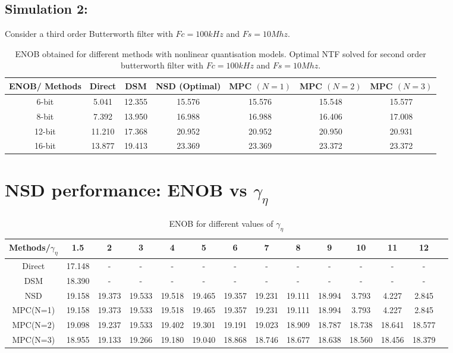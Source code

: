 \documentclass[a4paper]{article}
\begin{document}
\subsection{Simulation 2:}
Consider a third order Butterworth filter with $Fc = 100 \mathit{kHz}$ and $Fs = 10 \mathit{Mhz}$.
\begin{table}[!h]
	\caption{ENOB obtained for different methods with nonlinear quantisation models. Optimal NTF solved for second order butterworth filter with $Fc = 100 \mathit{kHz}$ and $Fs = 10 \mathit{Mhz}$.}
	\centering
	\begin{tabular}{|c|c|c|c|c|c|c|}
	\hline
	ENOB/ Methods & Direct & DSM & NSD (Optimal) & MPC $(N = 1)$ & MPC $(N= 2)$ & MPC $(N= 3)$  \\
        \hline
        6-bit &5.041 & 12.355 & 15.576 & 15.576 & 15.548 & 15.577\\
        \hline
        8-bit & 7.392 & 13.950 & 16.988  & 16.988 & 16.406 & 17.008\\
         \hline
        12-bit & 11.210 & 17.368 & 20.952 & 20.952 &  20.950 & 20.931\\
	\hline
	16-bit & 13.877 & 19.413 & 23.369  & 23.369 & 23.372& 23.372 \\
	\hline
	\end{tabular}		
\end{table}


\section{NSD performance: ENOB vs $\gamma_{\eta}$}
\begin{table}[!h]
	\caption{ENOB for different values of $\gamma_{\eta}$}
	\centering
	\begin{tabular}{|c|c|c|c|c|c|c|c|c|c|c|c|c|c|}
	\hline
	 Methods/$\gamma_{\eta}$ & 1.5 & 2 & 3 & 4 &5 & 6 & 7 & 8 & 9 &  10 & 11 & 12  \\
        \hline
        Direct &17.148 & - & - & - & - & - & -& - & - & - & - & - \\
        \hline
        DSM &18.390 & - & - & - & - & - & -& - & - & - & - &  - \\
        \hline
        NSD &19.158 & 19.373 & 19.533 & 19.518 & 19.465 & 19.357 &19.231 & 19.111 & 18.994  & 3.793 & 4.227 & 2.845\\
        \hline
        MPC(N=1) &19.158 & 19.373 & 19.533 & 19.518 & 19.465 & 19.357 &19.231 & 19.111 & 18.994  & 3.793 & 4.227 & 2.845\\
         \hline
        MPC(N=2) & 19.098& 19.237 & 19.533 & 19.402 & 19.301 & 19.191 & 19.023 & 18.909 & 18.787 & 18.738 & 18.641 & 18.577\\
	\hline
	MPC(N=3)  & 18.955& 19.133 & 19.266 & 19.180 & 19.040 & 18.868 & 18.746& 18.677 & 18.638 & 18.560 & 18.456 & 18.379\\
 


	\hline
	\end{tabular}		
\end{table}
\end{document}
